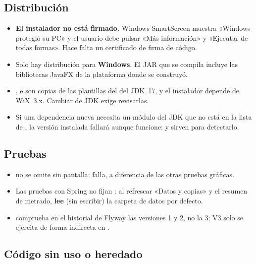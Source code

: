\subsection{Distribución}

\begin{itemize}
	\item \textbf{El instalador no está firmado.} Windows SmartScreen muestra «Windows protegió su PC» y el usuario debe
	      pulsar «Más información» y «Ejecutar de todas formas». Hace falta un certificado de firma de código.
	\item Solo hay distribución para \textbf{Windows}. El JAR que se compila incluye las bibliotecas JavaFX de la
	      plataforma donde se construyó.
	\item {},  e  son copias de las plantillas
	      del  del JDK~17, y el instalador depende de WiX~3.x. Cambiar de JDK exige revisarlas.
	\item Si una dependencia nueva necesita un módulo del JDK que no está en la lista de , la versión
	      instalada fallará aunque  funcione:  y
	       sirven para detectarlo.
\end{itemize}

\subsection{Pruebas}

\begin{itemize}
	\item {} no se omite sin pantalla: falla, a diferencia de las otras pruebas gráficas.
	\item Las pruebas con Spring no fijan : al refrescar «Datos y copias» y el resumen de metrado,
	       \textbf{lee} (sin escribir) la carpeta de datos por defecto.
	\item {} comprueba en el historial de Flyway las versiones 1 y 2, no la 3; V3 solo se
	      ejercita de forma indirecta en .
\end{itemize}

\subsection{Código sin uso o heredado}

